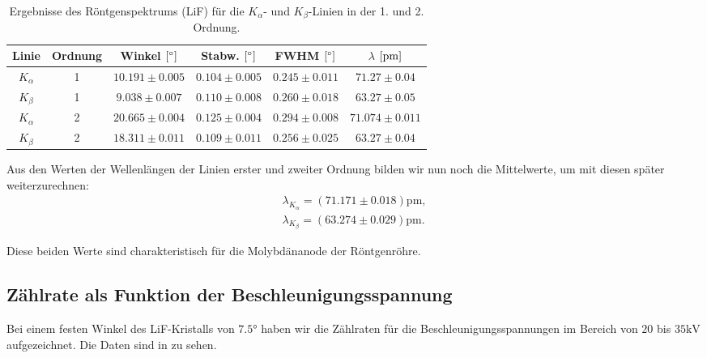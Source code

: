 \begin{table}[H]
  \centering
  \begin{tabular}{c|c|c|c|c|c}
    Linie & Ordnung & Winkel $\qty[\si{\degree}]$ & Stabw. $\qty[\si{\degree}]$ & FWHM $\qty[\si{\degree}]$ & $\lambda$ $\qty[\si{\pico\meter}]$\\\hline
    $K_{\alpha}$ & 1 & $10.191 \pm 0.005$ & $0.104 \pm 0.005$ & $0.245 \pm 0.011$ & $71.27 \pm 0.04$ \\
    $K_{\beta}$  & 1 & $9.038 \pm 0.007$  & $0.110 \pm 0.008$ & $0.260 \pm 0.018$ & $63.27 \pm 0.05$ \\\hline
    $K_{\alpha}$ & 2 & $20.665 \pm 0.004$ & $0.125 \pm 0.004$ & $0.294 \pm 0.008$ & $71.074 \pm 0.011$ \\
    $K_{\beta}$  & 2 & $18.311 \pm 0.011$ & $0.109 \pm 0.011$ & $0.256 \pm 0.025$ & $63.27 \pm 0.04$ \\\hline
  \end{tabular}
  \caption{Ergebnisse des Röntgenspektrums (LiF) für die $K_{\alpha}$- und $K_{\beta}$-Linien in der 1. und 2. Ordnung.}
  \label{tab:roentgenspektrum}
\end{table}

Aus den Werten der Wellenlängen der Linien erster und zweiter Ordnung bilden wir nun noch die Mittelwerte, um mit diesen später weiterzurechnen:
\begin{align}
  \lambda_{K_{\alpha}} = (71.171 \pm 0.018)\si{\pico\meter},\\[1em]
  \lambda_{K_{\beta}} = (63.274 \pm 0.029)\si{\pico\meter}.
\end{align}

Diese beiden Werte sind charakteristisch für die Molybdänanode der Röntgenröhre.

\subsection{Zählrate als Funktion der Beschleunigungsspannung}

Bei einem festen Winkel des LiF-Kristalls von $7.5\si{\degree}$ haben wir die Zählraten für die Beschleunigungsspannungen im Bereich von $20$ bis $35\si{\kilo\volt}$ aufgezeichnet. Die Daten sind in  zu sehen.

